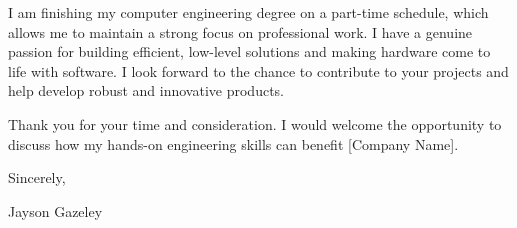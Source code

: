 \vspace{0.2cm}
I am finishing my computer engineering degree on a part-time schedule, which allows me to maintain a strong focus on professional work. I have a genuine passion for building efficient, low-level solutions and making hardware come to life with software. I look forward to the chance to contribute to your projects and help develop robust and innovative products.

\vspace{0.4cm}
Thank you for your time and consideration. I would welcome the opportunity to discuss how my hands-on engineering skills can benefit [Company Name].

\vspace{0.6cm}
Sincerely,

\vspace{1cm}
Jayson Gazeley

\newpage